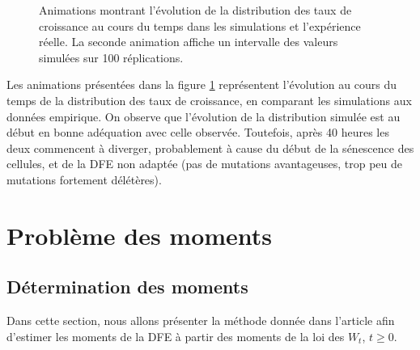 \documentclass[12pt]{article}
\begin{document}
\begin{figure}[!h]
  \begin{center}
    \vspace{3mm}
  \end{center} 
  \caption{\label{fig:animations}Animations montrant l'évolution de la distribution des taux de croissance au cours du temps dans les simulations et l'expérience réelle. La seconde animation affiche un intervalle des valeurs simulées sur 100 réplications.}
\end{figure}

Les animations présentées dans la figure \ref{fig:animations} représentent l'évolution au cours du temps de la distribution des taux de croissance, en comparant les simulations aux données empirique. On observe que l'évolution de la distribution simulée est au début en bonne adéquation avec celle observée. Toutefois, après 40 heures les deux commencent à diverger, probablement à cause du début de la sénescence des cellules, et de la DFE non adaptée (pas de mutations avantageuses, trop peu de mutations fortement délétères).

\FloatBarrier
\section{Problème des moments}

\subsection{Détermination des moments}\label{ss:det_mom}

Dans cette section, nous allons présenter la méthode donnée dans l'article afin d'estimer les moments de la DFE à partir des moments de la loi des $W_t$, $t\geqslant 0$.
\end{document}
